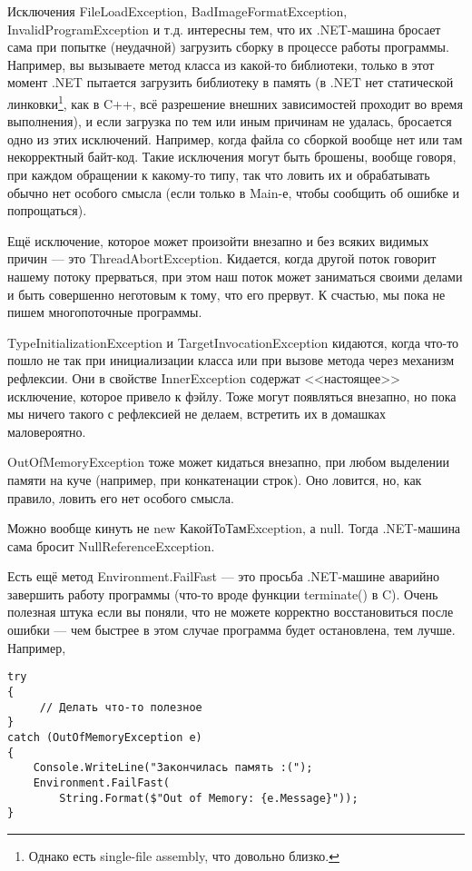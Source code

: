 \documentclass{../../text-style}
\begin{document}
Исключения FileLoadException, BadImageFormatException, InvalidProgramException и т.д. интересны тем, что их .NET-машина бросает сама при попытке (неудачной) загрузить сборку в процессе работы программы. Например, вы вызываете метод класса из какой-то библиотеки, только в этот момент .NET пытается загрузить библиотеку в память (в .NET нет статической линковки\footnote{Однако есть single-file assembly, что довольно близко.}, как в C++, всё разрешение внешних зависимостей проходит во время выполнения), и если загрузка по тем или иным причинам не удалась, бросается одно из этих исключений. Например, когда файла со сборкой вообще нет или там некорректный байт-код. Такие исключения могут быть брошены, вообще говоря, при каждом обращении к какому-то типу, так что ловить их и обрабатывать обычно нет особого смысла (если только в Main-е, чтобы сообщить об ошибке и попрощаться).

Ещё исключение, которое может произойти внезапно и без всяких видимых причин --- это ThreadAbortException. Кидается, когда другой поток говорит нашему потоку прерваться, при этом наш поток может заниматься своими делами и быть совершенно неготовым к тому, что его прервут. К счастью, мы пока не пишем многопоточные программы.

TypeInitializationException и TargetInvocationException кидаются, когда что-то пошло не так при инициализации класса или при вызове метода через механизм рефлексии. Они в свойстве InnerException содержат <<настоящее>> исключение, которое привело к фэйлу. Тоже могут появляться внезапно, но пока мы ничего такого с рефлексией не делаем, встретить их в домашках маловероятно.

OutOfMemoryException тоже может кидаться внезапно, при любом выделении памяти на куче (например, при конкатенации строк). Оно ловится, но, как правило, ловить его нет особого смысла.

Можно вообще кинуть не new КакойТоТамException, а null. Тогда .NET-машина сама бросит NullReferenceException.

Есть ещё метод Environment.FailFast --- это просьба .NET-машине аварийно завершить работу программы (что-то вроде функции terminate() в C). Очень полезная штука если вы поняли, что не можете корректно восстановиться после ошибки --- чем быстрее в этом случае программа будет остановлена, тем лучше. Например,

\begin{verbatim}
try 
{
     // Делать что-то полезное
}
catch (OutOfMemoryException e) 
{
    Console.WriteLine("Закончилась память :(");
    Environment.FailFast(
        String.Format($"Out of Memory: {e.Message}"));
}
\end{verbatim}
\end{document}
